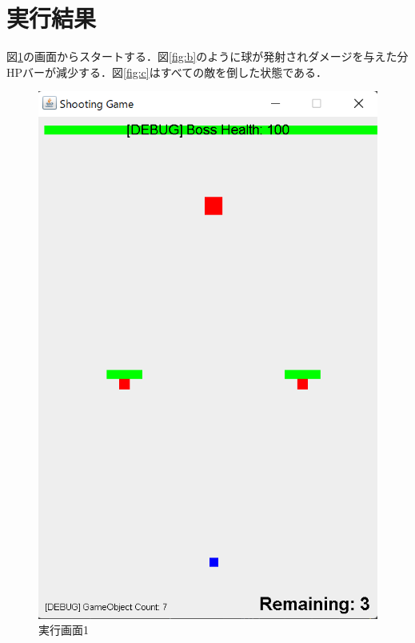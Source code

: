 \documentclass[dvipdfmx]{jlreq}
\begin{document}
\section{実行結果}
図\ref{fig:a}の画面からスタートする．図\ref{fig:b}のように球が発射されダメージを与えた分HPバーが減少する．図\ref{fig:c}はすべての敵を倒した状態である．
\begin{figure}[H]
\centering
\begin{minipage}[b]{0.32\columnwidth}
    \centering
    \includegraphics[width=0.7\columnwidth]{figures/result1.png}
    \caption{実行画面1}
    \label{fig:a}
\end{minipage}
\begin{minipage}[b]{0.32\columnwidth}
    \centering

\end{minipage}
\end{figure}
\end{document}
